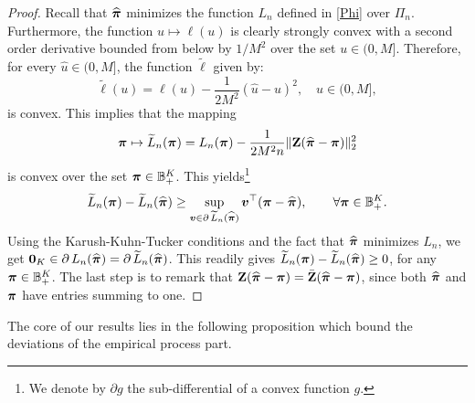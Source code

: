 \begin{proof}
	Recall that $\widehat{\boldsymbol \pi}$ minimizes the function $L_n$ defined in \eqref{Phi} over $\Pi_n$. Furthermore,
	the function $u\mapsto \ell(u)$ is clearly strongly convex with a second order derivative bounded from below
	by $1/M^2$ over the set $u\in(0,M]$. Therefore, for every $\hat u\in(0,M]$, the function $\widetilde{\ell}$ given by:
	\begin{equation}
	\widetilde{\ell}(u)=\ell(u)-\frac{1}{2M^2}(\hat{u}-u)^2,\quad u\in(0,M],
	\end{equation}
	is convex.
	This implies that the mapping
	\begin{equation}
	\boldsymbol \pi\mapsto \widetilde L_n(\boldsymbol \pi) = L_n(\boldsymbol \pi)-\frac1{2 M^2 n}\|\mathbf Z(\widehat{\boldsymbol \pi}-\boldsymbol \pi)\|_2^2
	\end{equation}
	is convex over the set $\boldsymbol \pi\in {\mathbb B}^K_+$. This yields\footnote{We denote by $\partial g$ the sub-differential of a convex function $g$.}
	\begin{equation}
	\widetilde L_n(\boldsymbol \pi) -\widetilde L_n(\widehat{\boldsymbol \pi}) \ge \sup_{\boldsymbol v\in \partial\, \widetilde L_n(\widehat{\boldsymbol \pi})}\boldsymbol v^\top (\boldsymbol \pi-\widehat{\boldsymbol \pi}) ,\qquad \forall\boldsymbol \pi\in{\mathbb B}^K_+.
	\end{equation}
	Using the Karush-Kuhn-Tucker conditions and the fact that $\widehat{\boldsymbol \pi}$ minimizes $L_n$, we 
	get $\mathbf 0_K\in \partial\,L_n(\widehat{\boldsymbol \pi}) = \partial\,\widetilde L_n(\widehat{\boldsymbol \pi})$. This 
	readily gives $\widetilde L_n(\boldsymbol \pi) -\widetilde L_n(\widehat{\boldsymbol \pi})\ge 0$, for any $\boldsymbol \pi\in{\mathbb B}^K_+$. 
	The last step is to remark that $\mathbf Z(\widehat{\boldsymbol \pi}-\boldsymbol \pi) = \bar{\mathbf Z}(\widehat{\boldsymbol \pi}-\boldsymbol \pi)$, since both
	$\widehat{\boldsymbol \pi}$ and $\boldsymbol \pi$ have entries summing to one.
\end{proof}

The core of our results lies in the following proposition which bound the deviations of the empirical process part.


